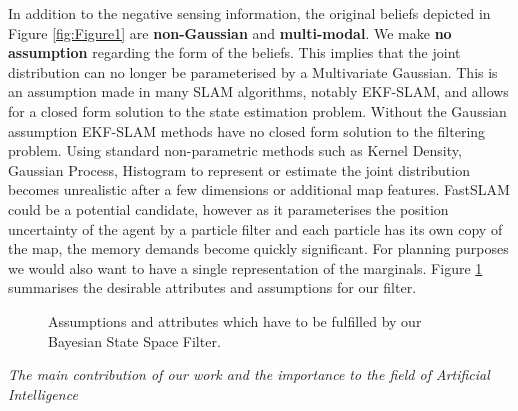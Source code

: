 In addition to the negative sensing information, the original beliefs depicted in Figure \ref{fig:Figure1} are \textbf{non-Gaussian}
and \textbf{multi-modal}. We make \textbf{no assumption} regarding the form of the beliefs. This implies that the joint distribution 
can no longer be parameterised by a Multivariate Gaussian. 
This is an assumption made in many SLAM algorithms, notably EKF-SLAM, and allows for a closed form solution to the state estimation problem. Without the 
Gaussian assumption EKF-SLAM methods have no closed form solution to the filtering problem. 
Using standard non-parametric methods such as Kernel Density, Gaussian Process, Histogram to represent or estimate the joint distribution becomes
unrealistic after a few dimensions or additional map features. 
FastSLAM could be a potential candidate, however as it parameterises the position uncertainty of the agent by a particle filter and each
particle has its own copy of the map, the memory demands become quickly significant.  For planning purposes we would also want to have a 
single representation of the marginals. Figure \ref{fig:ch5_assmuptions} summarises the desirable attributes and assumptions for our filter.

\begin{figure}
\centering
{}%
\caption{Assumptions and attributes which have to be fulfilled by our Bayesian State Space Filter. }
 \label{fig:ch5_assmuptions}
\end{figure}

\textit{The main contribution of our work and the importance to the field of Artificial Intelligence} 

